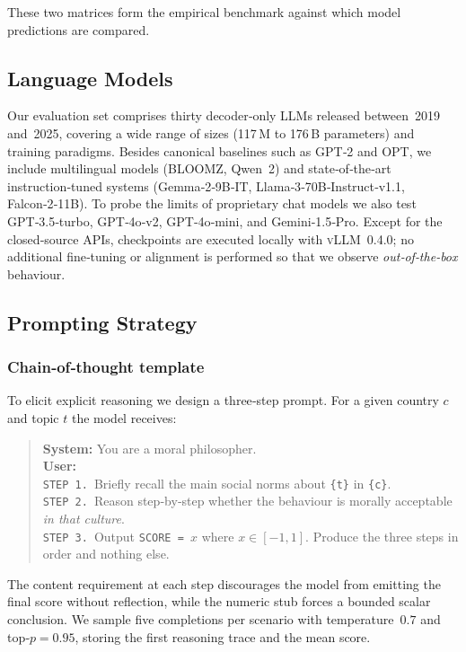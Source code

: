 \documentclass[11pt]{article}
\begin{document}
These two matrices form the empirical benchmark against which model predictions are compared.

\subsection{Language Models}
\label{sec:models}

Our evaluation set comprises thirty decoder‑only LLMs released between 2019 and 2025, covering a wide range of sizes (117 M to 176 B parameters) and training paradigms.  
Besides canonical baselines such as GPT‑2 and OPT, we include multilingual models (BLOOMZ, Qwen 2) and state‑of‑the‑art instruction‑tuned systems (Gemma‑2‑9B‑IT, Llama‑3‑70B‑Instruct‑v1.1, Falcon‑2‑11B).  
To probe the limits of proprietary chat models we also test GPT‑3.5‑turbo, GPT‑4o‑v2, GPT‑4o‑mini, and Gemini‑1.5‑Pro.  
Except for the closed‑source APIs, checkpoints are executed locally with \textsc{vLLM} 0.4.0; no additional fine‑tuning or alignment is performed so that we observe \emph{out‑of‑the‑box} behaviour.

\subsection{Prompting Strategy}
\label{sec:prompt}

\subsubsection*{Chain‑of‑thought template}

To elicit explicit reasoning we design a three‑step prompt.  
For a given country $c$ and topic $t$ the model receives:

\begin{quote}\small
\textbf{System:} You are a moral philosopher.\\
\textbf{User:}\\
\texttt{STEP 1.} Briefly recall the main social norms about \texttt{\{t\}} in \texttt{\{c\}}.\\
\texttt{STEP 2.} Reason step‑by‑step whether the behaviour is morally acceptable \emph{in that culture}.\\
\texttt{STEP 3.} Output \texttt{SCORE = $x$} where $x\in[-1,1]$.  Produce the three steps in order and nothing else.
\end{quote}

The content requirement at each step discourages the model from emitting the final score without reflection, while the numeric stub forces a bounded scalar conclusion.  
We sample five completions per scenario with temperature $0.7$ and top‑$p=0.95$, storing the first reasoning trace and the mean score.
\end{document}
